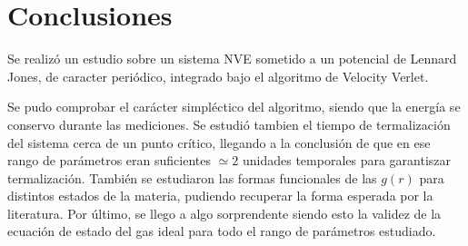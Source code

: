 \documentclass[%
 reprint,
 amsmath,amssymb,
 aps,
]{revtex4-1}
\begin{document}
\section{Conclusiones}

Se realiz\'o un estudio sobre un sistema NVE sometido a un potencial de
Lennard Jones, de caracter peri\'odico, integrado bajo el algoritmo de Velocity
Verlet.

Se pudo comprobar el car\'acter simpl\'ectico del algoritmo, siendo que la
energ\'ia se conservo durante las mediciones. Se estudi\'o tambien el tiempo
de termalizaci\'on del sistema cerca de un punto cr\'itico, llegando a la
conclusi\'on de que en ese rango de par\'ametros eran suficientes $\simeq 2$
unidades temporales para garantiszar termalizaci\'on. Tambi\'en se estudiaron
las formas funcionales de las $g(r)$ para distintos estados de la materia,
pudiendo recuperar la forma esperada por la literatura. Por \'ultimo, se llego
a algo sorprendente siendo esto la validez de la ecuaci\'on de estado del gas
ideal para todo el rango de par\'ametros estudiado.

\appendix
\end{document}
